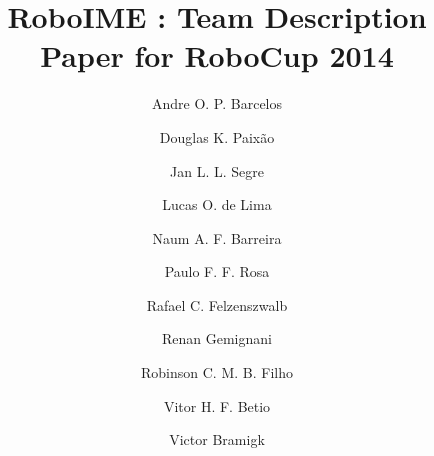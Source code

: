 \documentclass[brazil,english]{llncs}
\begin{document}
\title{RoboIME : Team Description Paper for RoboCup 2014}
\author{
 Andre O. P. Barcelos \and
 Douglas K. Paixão \and
 Jan L. L. Segre \and
 Lucas O. de Lima \and
 Naum A. F. Barreira \and
 Paulo F. F. Rosa \and
 Rafael C. Felzenszwalb \and
 Renan Gemignani \and
 Robinson C. M. B. Filho \and
 Vitor H. F. Betio \and
 Victor Bramigk
}

\maketitle



%






\end{document}
